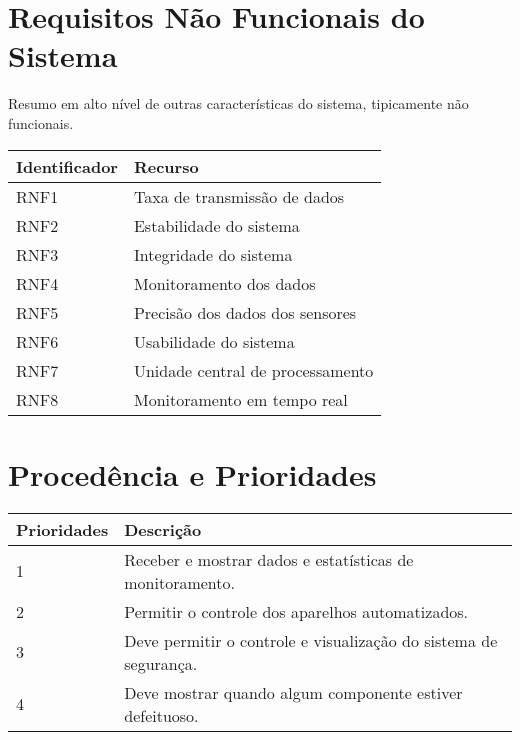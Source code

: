 \section{Requisitos Não Funcionais do Sistema}

	Resumo em alto nível de outras características do sistema, tipicamente não funcionais.

\begin{tabular}{|l|l|}
\hline 
\textbf{Identificador} & \textbf{Recurso}\tabularnewline
\hline 
\hline 
RNF1 & Taxa de transmissão de dados\tabularnewline
\hline 
RNF2 & Estabilidade do sistema\tabularnewline
\hline 
RNF3 & Integridade do sistema\tabularnewline
\hline 
RNF4 & Monitoramento dos dados\tabularnewline
\hline 
RNF5 & Precisão dos dados dos sensores\tabularnewline
\hline 
RNF6 & Usabilidade do sistema\tabularnewline
\hline 
RNF7 & Unidade central de processamento\tabularnewline
\hline 
RNF8 & Monitoramento em tempo real\tabularnewline
\hline 
\end{tabular}

\section{Procedência e Prioridades}

\begin{tabular}{|l|l|}
\hline 
\textbf{Prioridades} & \textbf{Descrição}\tabularnewline
\hline 
\hline 
1 & Receber e mostrar dados e estatísticas de monitoramento. \tabularnewline
\hline 
2 & Permitir o controle dos aparelhos automatizados. \tabularnewline
\hline 
3 & Deve permitir o controle e visualização do sistema de segurança. \tabularnewline
\hline 
4 & Deve mostrar quando algum componente estiver defeituoso. \tabularnewline
\hline 
\end{tabular}

